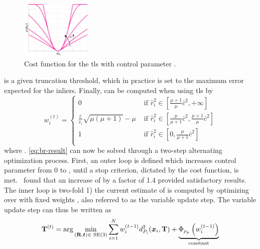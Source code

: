 \begin{figure}[!h]
	\begin{center}
		\includegraphics[width=0.3\textwidth]{chapters/2-pose-estimation/fig/tls-cost.pdf}
	\end{center}
	\caption{Cost function for the \gls{tls} with control parameter \mvar{\mu}.}
	\label{fig:tls-cost}
\end{figure}
 is a given truncation threshold, which in practice is set to the maximum error expected for the inliers. Finally,  can be computed when using \gls{tls} by
%
\begin{equation}\label{eq:tls-weights}
	w_i^{(t)} = \begin{cases}
		0 & \text{ if } \hat{r}_i^2\in\left[ \frac{\mu+1}{\mu}\bar{c}^2, +\infty \right] \\
		\frac{\bar{c}}{\hat{r}_i}\sqrt{\mu(\mu+1)} - \mu & \text{ if } \hat{r}_i^2\in\left[ \frac{\mu}{\mu+1}\bar{c}^2, \frac{\mu + 1}{\mu}\bar{c}^2 \right] \\
		1 & \text{ if } \hat{r}_i^2\in\left[ 0, \frac{\mu}{\mu + 1}\bar{c}^2 \right] \\
	\end{cases}
\end{equation}
where . \eqref{eq:br-result} can now be solved through a two-step alternating optimization process. First, an outer loop is defined which increases control parameter \mvar{\mu} from \num{0} to \mvar{\infty}, until a stop criterion, dictated by the cost function, is met.~\cite{graduated-non-convexity-for-robust-spatial-perception:-from-non-minimal-solvers-to-global-outlier-rejection} found that an increase of \mvar{\mu} by a factor of \num{1.4} provided satisfactory results.
The inner loop is two-fold 1) the current estimate of  is computed by optimizing over \tf[T]{}{} with fixed weights , also referred to as the variable update step. The variable update step can thus be written as
%
\begin{equation}\label{eq:variable-update}
	\tf[T]{(t)}{} = \arg\min_{(\mat{R},\vec{t})\in\SE (3)} \sum^N_{i=1}w_i^{(t-1)}d_{P_i}^2(\vec{x}_i,\mat{T}) + \underbrace{\Phi_{\rho_\mu}\left(w_i^{(t-1)}\right)}_{\text{constant}}
\end{equation}

